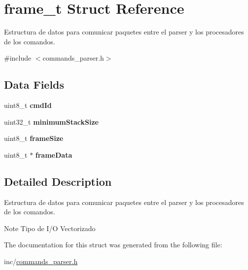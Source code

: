 \hypertarget{structframe__t}{}\section{frame\+\_\+t Struct Reference}
\label{structframe__t}


Estructura de datos para comunicar paquetes entre el parser y los procesadores de los comandos.  




{\ttfamily \#include $<$commands\+\_\+parser.\+h$>$}

\subsection*{Data Fields}
\begin{DoxyCompactItemize}
\item 
uint8\+\_\+t {\bfseries cmd\+Id}\hypertarget{structframe__t_a33f92cb19835d611bb479893731add65}{}\label{structframe__t_a33f92cb19835d611bb479893731add65}

\item 
uint32\+\_\+t {\bfseries minimum\+Stack\+Size}\hypertarget{structframe__t_aee67bdf55a0a9cbfb6d0487b1b1260e1}{}\label{structframe__t_aee67bdf55a0a9cbfb6d0487b1b1260e1}

\item 
uint8\+\_\+t {\bfseries frame\+Size}\hypertarget{structframe__t_a7a07cde13937322d632241b5c5b4ef58}{}\label{structframe__t_a7a07cde13937322d632241b5c5b4ef58}

\item 
uint8\+\_\+t $\ast$ {\bfseries frame\+Data}\hypertarget{structframe__t_ad36f89b8c2d55e254c4e5aeb067d340a}{}\label{structframe__t_ad36f89b8c2d55e254c4e5aeb067d340a}

\end{DoxyCompactItemize}


\subsection{Detailed Description}
Estructura de datos para comunicar paquetes entre el parser y los procesadores de los comandos. 

\begin{DoxyNote}{Note}
Tipo de I/O Vectorizado 
\end{DoxyNote}


The documentation for this struct was generated from the following file\+:\begin{DoxyCompactItemize}
\item 
inc/\hyperlink{commands__parser_8h}{commands\+\_\+parser.\+h}\end{DoxyCompactItemize}
